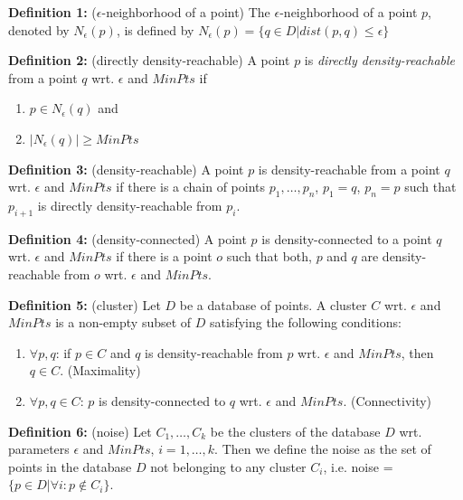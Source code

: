 \documentclass[conference, 10pt]{IEEEtran}
\begin{document}
\begin{description}
  \item{\textbf{Definition 1:}} ($\epsilon$-neighborhood of a point) The $\epsilon$-neighborhood of a point $p$, denoted by $N_{\epsilon}(p)$, is defined by $N_{\epsilon}(p) = \{q \in D | dist(p,q) \leq \epsilon \}$
  \item{\textbf{Definition 2:}} (directly density-reachable) A point $p$ is \emph{directly density-reachable} from a point $q$ wrt. $\epsilon$ and $MinPts$ if
  \begin{enumerate}
    \item{$p \in N_{\epsilon}(q)$} and
    \item{$|N_{\epsilon}(q)| \geq MinPts$}
  \end{enumerate}
  \item{\textbf{Definition 3:}} (density-reachable) A point $p$ is density-reachable from a point $q$ wrt. $\epsilon$ and $MinPts$ if there is a chain of points $p_{1}, \ldots, p_{n}$, $p_{1} = q$, $p_{n} = p$ such that $p_{i+1}$ is directly density-reachable from $p_{i}$.

  \item{\textbf{Definition 4:}} (density-connected) A point $p$ is density-connected to a point $q$ wrt. $\epsilon$ and $MinPts$ if there is a point
$o$ such that both, $p$ and $q$ are density-reachable from $o$ wrt. $\epsilon$ and $MinPts$.

  \item{\textbf{Definition 5:}} (cluster) Let $D$ be a database of points. A cluster $C$ wrt. $\epsilon$ and $MinPts$ is a non-empty subset of $D$
satisfying the following conditions:
\begin{enumerate}
\item{} $\forall  p, q$: if $p \in C$ and $q$ is density-reachable from $p$ wrt. $\epsilon$ and $MinPts$, then $q \in C$. (Maximality)
\item{} $\forall  p, q \in C$: $p$ is density-connected to $q$ wrt. $\epsilon$ and $MinPts$. (Connectivity)
\end{enumerate}

  \item{\textbf{Definition 6:}} (noise) Let $C_{1}, \ldots , C_{k}$ be the clusters of the database $D$ wrt. parameters $\epsilon$ and $MinPts$, $i = 1, \ldots, k$. Then we define the noise as the set of points in the database $D$ not belonging to any cluster $C_{i}$,  i.e. noise = $\{p \in D | \forall i: p \notin C_{i}\}$. \\

\end{description}
\end{document}

